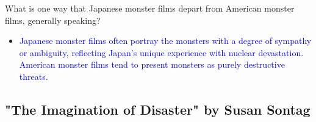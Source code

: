 \documentclass[11pt,fleqn]{book}
\begin{document}
\begin{exercise}
What is one way that Japanese monster films depart from American monster films, generally speaking?
\begin{itemize}
\item \textcolor{blue}{Japanese monster films often portray the monsters with a degree of sympathy or ambiguity, reflecting Japan's unique experience with nuclear devastation. American monster films tend to present monsters as purely destructive threats.}
\end{itemize}
\end{exercise}

\subsection*{"The Imagination of Disaster" by Susan Sontag}
\end{document}
